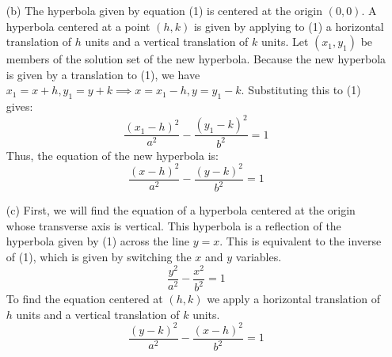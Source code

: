\documentclass{article}
\begin{document}
\begin{itemize}
\item[(b)]
The hyperbola given by equation (1) is centered at the origin $(0,0)$. A hyperbola centered at a point $(h,k)$ is given by applying to (1) a horizontal translation of $h$ units and a vertical translation of $k$ units. Let $(x_1,y_1)$ be members of the solution set of the new hyperbola. Because the new hyperbola is given by a translation to (1), we have $x_1=x+h,y_1=y+k\implies x=x_1-h,y=y_1-k$. Substituting this to (1) gives:
\begin{equation*}
	\frac{(x_1-h)^2}{a^2}-\frac{(y_1-k)^2}{b^2}=1
\end{equation*}
Thus, the equation of the new hyperbola is:
\begin{equation*}
	\boxed{\frac{(x-h)^2}{a^2}-\frac{(y-k)^2}{b^2}=1} \tag{2}
\end{equation*}

\item[(c)]
First, we will find the equation of a hyperbola centered at the origin whose transverse axis is vertical. This hyperbola is a reflection of the hyperbola given by (1) across the line $y=x$. This is equivalent to the inverse of (1), which is given by switching the $x$ and $y$ variables.
\begin{equation*}
	\frac{y^2}{a^2}-\frac{x^2}{b^2}=1
\end{equation*}
To find the equation centered at $(h,k)$ we apply a horizontal translation of $h$ units and a vertical translation of $k$ units.
\begin{equation*}
	\boxed{\frac{(y-k)^2}{a^2}-\frac{(x-h)^2}{b^2}=1} \tag{3}
\end{equation*}

\end{itemize}
\end{document}

